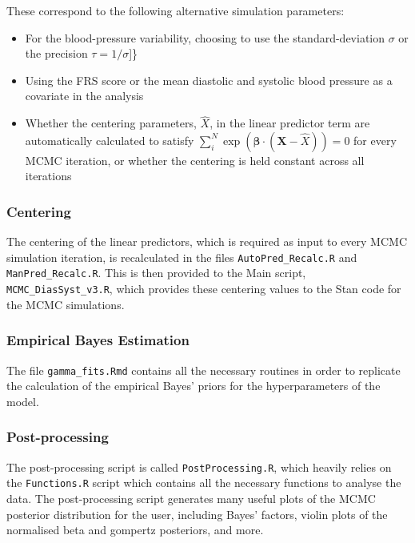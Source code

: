 \documentclass[
]{article}
\providecommand{\tightlist}{%
  \setlength{\itemsep}{0pt}\setlength{\parskip}{0pt}}
\begin{document}
These correspond to the following alternative simulation parameters:

\begin{itemize}
\tightlist
\item
  For the blood-pressure variability, choosing to use the standard-deviation \(\sigma\) or the precision \(\tau=1/\sigma\){]}\}
\item
  Using the FRS score or the mean diastolic and systolic blood pressure as a covariate in the analysis
\item
  Whether the centering parameters, \(\hat{X}\), in the linear predictor term are automatically calculated to satisfy \(\sum_i^N \exp{(\boldsymbol{\beta}\cdot(\boldsymbol{X}-\hat{X}))}=0\) for every MCMC iteration, or whether the centering is held constant across all iterations
\end{itemize}

\hypertarget{centering}{%
\subsubsection{Centering}\label{centering}}

The centering of the linear predictors, which is required as input to every MCMC simulation iteration, is recalculated in the files \texttt{AutoPred\_Recalc.R} and \texttt{ManPred\_Recalc.R}. This is then provided to the Main script, \texttt{MCMC\_DiasSyst\_v3.R}, which provides these centering values to the Stan code for the MCMC simulations.

\hypertarget{empirical-bayes-estimation}{%
\subsubsection{Empirical Bayes Estimation}\label{empirical-bayes-estimation}}

The file \texttt{gamma\_fits.Rmd} contains all the necessary routines in order to replicate the calculation of the empirical Bayes' priors for the hyperparameters of the model.

\hypertarget{post-processing}{%
\subsubsection{Post-processing}\label{post-processing}}

The post-processing script is called \texttt{PostProcessing.R}, which heavily relies on the \texttt{Functions.R} script which contains all the necessary functions to analyse the data. The post-processing script generates many useful plots of the MCMC posterior distribution for the user, including Bayes' factors, violin plots of the normalised beta and gompertz posteriors, and more.
\end{document}
